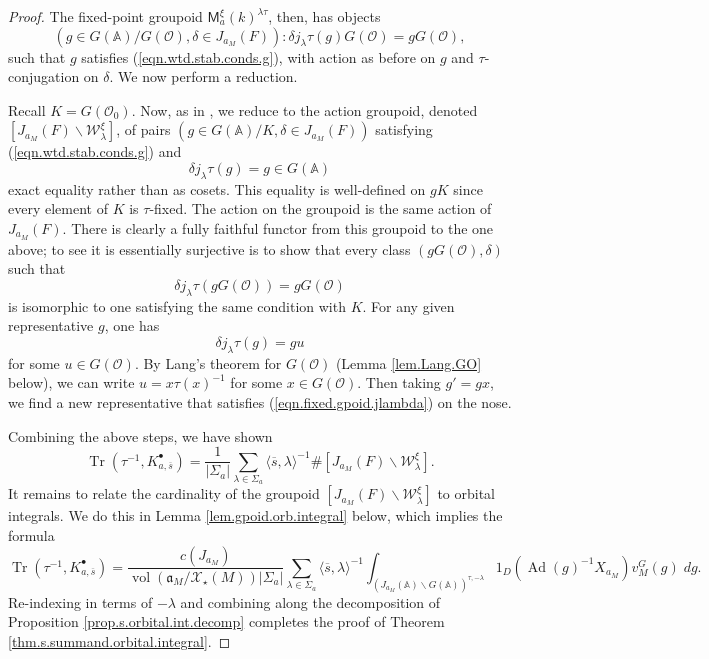 \documentclass[openany]{amsbook}
\theoremstyle{definition}
\theoremstyle{remark}
\numberwithin{equation}{section}
\renewcommand{\O}{\mathcal{O}}
\newcommand{\cX}{\mathcal{X}}
\newcommand{\A}{\mathbb{A}}
\newcommand{\ol}[1]{\overline{#1}}
\newcommand{\Tr}{\operatorname{Tr }}
\newcommand{\vol}{\operatorname{vol}}
\renewcommand{\-}{\operatorname{-}}
\renewcommand{\a}{\mathfrak{a}}
\newcommand{\on}[1]{\operatorname{#1}}
\renewcommand{\A}{\mathbb{A}}
\newcommand{\bM}{\mathsf{M}}
\newcommand{\Ad}{\on{Ad}}
\begin{document}
\begin{proof}
    
                    
    The fixed-point groupoid $\bM_a^{\xi}(k)^{\lambda \tau}$, then, has objects
    \begin{equation}\label{eqn.fixed.gpoid}
        (g \in G(\A)/G(\O), \delta \in J_{a_M}(F)) : \delta j_\lambda \tau(g) G(\O) = g G(\O),
    \end{equation}
    such that $g$ satisfies (\ref{eqn.wtd.stab.conds.g}), with action as before on $g$ and $\tau$-conjugation on $\delta$. We now perform a reduction.

    Recall $K = G(\O_0)$. Now, as in \cite[Lemme 12.3.3]{CLII}, we reduce to the action groupoid, denoted $[J_{a_M}(F) \backslash \mathcal{W}^\xi_{\lambda}]$, of pairs $(g \in G(\A)/K, \delta \in J_{a_M}(F))$ satisfying (\ref{eqn.wtd.stab.conds.g}) and  \begin{equation}\label{eqn.fixed.gpoid.jlambda}
        \delta j_{\lambda} \tau(g) = g \in G(\A) 
    \end{equation}
    exact equality rather than as cosets. This equality is well-defined on $g K$ since every element of $K$ is $\tau$-fixed. The action on the groupoid is the same action of $J_{a_M}(F)$. There is clearly a fully faithful functor from this groupoid to the one above; to see it is essentially surjective is to show that every class $(g G(\O), \delta)$ such that $$\delta j_\lambda \tau(g G(\O)) = g G(\O)$$ is isomorphic to one satisfying the same condition with $K$. For any given representative $g$, one has
    $$
        \delta j_\lambda \tau(g) = g u
    $$
    for some $u \in G(\O)$. By Lang's theorem for $G(\O)$ (Lemma \ref{lem.Lang.GO} below), we can write $u = x \tau(x)^{-1}$ for some $x \in G(\O)$. Then taking $g' = gx$, we find a new representative that satisfies (\ref{eqn.fixed.gpoid.jlambda}) on the nose.

    Combining the above steps, we have shown
    $$
        \Tr(\tau^{-1}, K^\bullet_{a,\ol{s}}) = \frac{1}{|\Sigma_a|} \sum_{\lambda \in \Sigma_a} \langle \ol{s}, \lambda \rangle^{-1} \# [J_{a_M}(F)\backslash \mathcal{W}^\xi_\lambda].
    $$
    It remains to relate the cardinality of the groupoid $[J_{a_M}(F) \backslash \mathcal{W}^\xi_\lambda]$ to orbital integrals. We do this in Lemma \ref{lem.gpoid.orb.integral} below, which implies the formula
    $$
        \Tr(\tau^{-1}, K^\bullet_{a,\ol{s}}) = \frac{c(J_{a_M})}{\vol(\a_M/\cX_\star(M))|\Sigma_a|} \sum_{\lambda \in \Sigma_a} \langle \ol{s}, \lambda \rangle^{-1} \int_{(J_{a_M}(\A) \backslash G(\A))^{\tau,-\lambda}} 1_D(\Ad(g)^{-1} X_{a_M}) v_M^G(g) \; dg.
    $$
    Re-indexing in terms of $-\lambda$ and combining along the decomposition of Proposition \ref{prop.s.orbital.int.decomp} completes the proof of Theorem \ref{thm.s.summand.orbital.integral}.
\end{proof}
\end{document}
